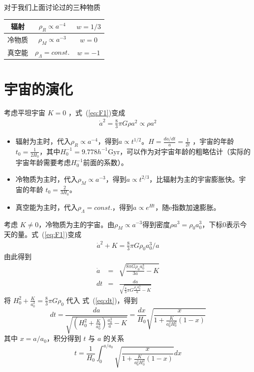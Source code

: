 \documentclass[]{ctexart}
\newcommand{\refeq}[1]{式~(\ref{#1})}
\begin{document}
对于我们上面讨论过的三种物质
\begin{table}[htb]
    \centering
    \begin{tabular}{|c|c|c|}
    \hline
    辐射  & $\rho_R\propto a^{-4}$ & $w=1/3$ \\ \hline
    冷物质 & $\rho_M\propto a^{-3}$ & $w=0$   \\ \hline
    真空能 & $\rho_\Lambda=const.$  & $w=-1$  \\ \hline
    \end{tabular}
\end{table}

\section{宇宙的演化}

考虑平坦宇宙 $K=0$ ，\refeq{eq:F1}变成
\begin{eqnarray}
    \dot{a}^2 = \frac{8}{3} \pi G \rho a^2 \propto \rho a^2
\end{eqnarray} 

\begin{itemize}
    \item 辐射为主时，代入$\rho_R\propto a^{-4}$，得到$a\propto t^{1/2}$。$H=\frac{da/dt}{a}=\frac{1}{2t}$ ，宇宙的年龄 $t_0=\frac{1}{2H_0}$，其中$H_0^{-1}= 9.778 h^{-1} \mathrm{Gyr}$，可以作为对宇宙年龄的粗略估计（实际的宇宙年龄需要考虑$H_0^{-1}$前面的系数）。
    \item 冷物质为主时，代入$\rho_M\propto a^{-3}$，得到$a\propto t^{2/3}$，比辐射为主的宇宙膨胀快。宇宙的年龄 $t_0=\frac{2}{3H_0}$。
    \item 真空能为主时，代入$\rho_\Lambda =const.$，得到$a\propto e^{Ht}$，随e指数加速膨胀。
\end{itemize}

考虑 $K\neq 0$，冷物质为主的宇宙。由$\rho_M\propto a^{-3}$得到密度$\rho a^3 = \rho_0 a^3_0$，下标0表示今天的量。\refeq{eq:F1}变成
\begin{eqnarray}
    \dot{a}^2 + K = \frac{8}{3} \pi G \rho_0 a_0^3/a 
\end{eqnarray} 
由此得到
\begin{eqnarray}
    \dot{a}&=&\sqrt{\frac{8 \pi G \rho_{0} a_{0}^{3}}{3 a}-K} \\
    d t&=&\frac{d a}{\sqrt{\frac{8}{3} \pi G \frac{\rho_{0} a_{0}^{3}}{a}-K}} \label{eq:dt}
\end{eqnarray}
将 $H_0^2+\frac{K}{a_0^2}=\frac{8}{3}\pi G \rho_0$  代入 \refeq{eq:dt}，得到
\begin{equation}
    d t=\frac{d a}{\sqrt{\left(H_{0}^{2}+\frac{K}{a_{0}^{2}}\right) \frac{a_{0}^{3}}{a}-K}}=\frac{d x}{H_{0}} \sqrt{\frac{x}{1+\frac{K}{a_{0}^{2} H_{0}^{2}}(1-x)}} \label{eq:dt-dx}
\end{equation}
其中 $x=a/a_0$，积分得到 $t$ 与 $a$ 的关系 
\begin{equation}
    t=\frac{1}{H_{0}} \int_{0}^{a/a_{0}} \sqrt{\frac{x}{1+\frac{K}{a_{0}^{2} H_{0}^{2}}(1-x)}} d x
\end{equation}
\end{document}
